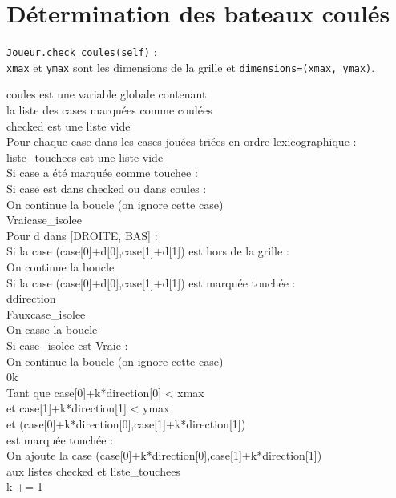 \section{Détermination des bateaux coulés}\label{check_coules}
\texttt{Joueur.check\_coules(self)} :\\
\texttt{xmax} et \texttt{ymax} sont les dimensions de la grille et \texttt{dimensions=(xmax, ymax)}.
\begin{algo1}
coules est une variable globale contenant\\
la liste des cases marquées comme coulées\\
checked est une liste vide\\
Pour chaque case dans les cases jouées triées en ordre lexicographique :\\
liste\_touchees est une liste vide\\
Si case a été marquée comme touchee :\\
Si case est dans checked ou dans coules :\\
On continue la boucle (on ignore cette case)\\
Vrai\sto case\_isolee\\
Pour d dans [DROITE, BAS] :\\
Si la case (case[0]+d[0],case[1]+d[1]) est hors de la grille :\\
On continue la boucle\\
Si la case (case[0]+d[0],case[1]+d[1]) est marquée touchée :\\
d\sto direction\\
Faux\sto case\_isolee\\
On casse la boucle\\
Si case\_isolee est Vraie :\\
On continue la boucle (on ignore cette case)\\
0\sto k\\
Tant que case[0]+k*direction[0] < xmax\\
et case[1]+k*direction[1] < ymax\\
et (case[0]+k*direction[0],case[1]+k*direction[1])\\
 est marquée touchée :\\
On ajoute la case (case[0]+k*direction[0],case[1]+k*direction[1])\\
aux listes checked et liste\_touchees\\
k += 1\\

\end{algo1}
